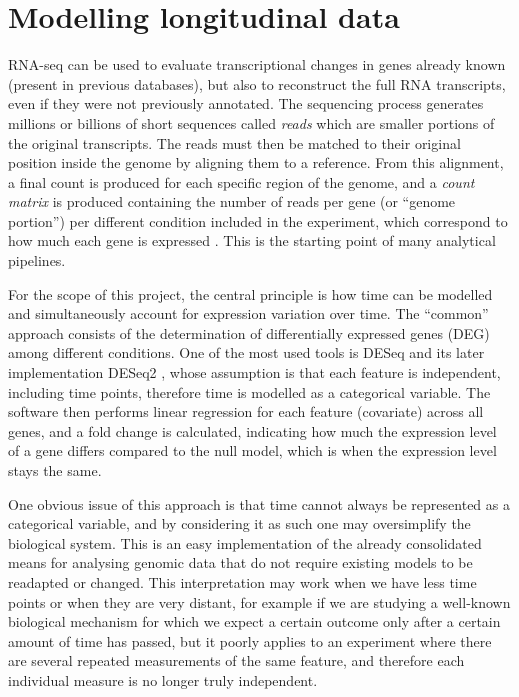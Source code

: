 \section{Modelling longitudinal data}
RNA-seq can be used to evaluate transcriptional changes in genes already known (present in previous databases), but also to reconstruct the full RNA transcripts, even if they were not previously annotated. The sequencing process generates millions or billions of short sequences called \emph{reads} which are smaller portions of the original transcripts. The reads must then be matched to their original position inside the genome by aligning them to a reference. From this alignment, a final count is produced for each specific region of the genome, and a \emph{count matrix} is produced containing the number of reads per gene (or ``genome portion'') per different condition included in the experiment, which correspond to how much each gene is expressed \citep{frazeeDifferentialExpressionAnalysis2014,nagalakshmiTranscriptionalLandscapeYeast2008}. This is the starting point of many analytical pipelines.

For the scope of this project, the central principle is how time can be modelled and simultaneously account for expression variation over time. The ``common'' approach consists of the determination of differentially expressed genes (DEG) among different conditions. One of the most used tools is DESeq \citep{andersDifferentialExpressionAnalysis2010} and its later implementation DESeq2 \citep{loveModeratedEstimationFold2014a}, whose assumption is that each feature is independent, including time points, therefore time is modelled as a categorical variable. The software then performs linear regression for each feature (covariate) across all genes, and a fold change is calculated, indicating how much the expression level of a gene differs compared to the null model, which is when the expression level stays the same.

One obvious issue of this approach is that time cannot always be represented as a categorical variable, and by considering it as such one may oversimplify the biological system. This is an easy implementation of the already consolidated means for analysing genomic data that do not require existing models to be readapted or changed. This interpretation may work when we have less time points or when they are very distant, for example if we are studying a well-known biological mechanism for which we expect a certain outcome only after a certain amount of time has passed, but it poorly applies to an experiment where there are several repeated measurements of the same feature, and therefore each individual measure is no longer truly independent. 

